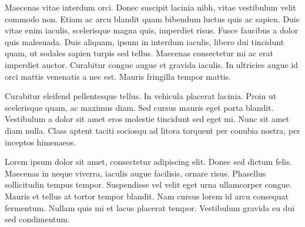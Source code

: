 Maecenas vitae interdum orci. Donec suscipit lacinia nibh, vitae vestibulum velit commodo non. Etiam ac arcu blandit quam bibendum luctus quis ac sapien. Duis vitae enim iaculis, scelerisque magna quis, imperdiet risus. Fusce faucibus a dolor quis malesuada. Duis aliquam, ipsum in interdum iaculis, libero dui tincidunt quam, ut sodales sapien turpis sed tellus. Maecenas consectetur mi ac erat imperdiet auctor. Curabitur congue augue et gravida iaculis. In ultricies augue id orci mattis venenatis a nec est. Mauris fringilla tempor mattis.

Curabitur eleifend pellentesque tellus. In vehicula placerat lacinia. Proin ut scelerisque quam, ac maximus diam. Sed cursus mauris eget porta blandit. Vestibulum a dolor sit amet eros molestie tincidunt sed eget mi. Nunc sit amet diam nulla. Class aptent taciti sociosqu ad litora torquent per conubia nostra, per inceptos himenaeos. 	


Lorem ipsum dolor sit amet, consectetur adipiscing elit. Donec sed dictum felis. Maecenas in neque viverra, iaculis augue facilisis, ornare risus. Phasellus sollicitudin tempus tempor. Suspendisse vel velit eget urna ullamcorper congue. Mauris et tellus at tortor tempor blandit. Nam cursus lorem id arcu consequat fermentum. Nullam quis mi et lacus placerat tempor. Vestibulum gravida eu dui sed condimentum.